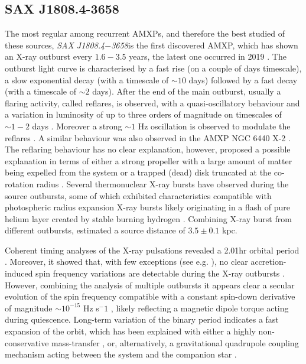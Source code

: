 \documentclass[graybox]{svmult}
\def \saxj{{\em SAX J1808.4$-$3658\xspace}}
\begin{document}
\subsection{SAX J1808.4-3658}

The most regular among recurrent AMXPs, and therefore the best studied of these sources, \saxj is the first discovered AMXP, which has shown an X-ray outburst every $1.6-3.5$ years, the latest one occurred in 2019 \cite{Bult2019c}. The outburst light curve is characterised by a fast rise (on a couple of days timescale), a slow exponential decay (with a timescale of $\sim 10$ days) followed by a fast decay (with a timescale of $\sim 2$ days). After the end of the main outburst, usually a flaring activity, called reflares, is observed, with a quasi-oscillatory behaviour and a variation in luminosity of up to three orders of magnitude on timescales of $\sim 1-2$ days \cite{Patruno2016}. Moreover a strong $\sim 1$ Hz oscillation is observed to modulate the reflares \cite{Bult2014}. A similar behaviour was also observed in the AMXP NGC 6440 X-2 \cite{Patruno2013}. The reflaring behaviour has no clear explanation, however, \cite{Patruno2016} proposed a possible explanation in terms of either a strong propeller with a large amount of matter being expelled from the system or a trapped (dead) disk truncated at the co-rotation radius \cite{DAngelo2012}.
Several thermonuclear X-ray bursts have observed during the source outbursts, some of which exhibited characteristics compatible with photospheric radius expansion X-ray bursts likely originating in a flash of pure helium layer created by stable burning hydrogen \cite{Galloway2006,Galloway2008}. Combining X-ray burst from different outbursts, \cite{Galloway2006} estimated a source distance of $3.5\pm0.1$ kpc.

Coherent timing analyses of the X-ray pulsations revealed a 2.01hr orbital period \cite{Chakrabarty1998}. Moreover, it showed that, with few exceptions (see e.g. \cite{Burderi2006}), no clear accretion-induced spin frequency variations are detectable during the X-ray outbursts \cite{Hartman2008,Patruno2012a,Patruno2017}. However, combining the analysis of multiple outbursts it appears clear a secular evolution of the spin frequency compatible with a constant spin-down derivative of magnitude $\sim10^{−15}$ Hz s$^−1$ \cite{Hartman2008,Patruno2012,Sanna2017c,Bult2019c}, likely reflecting a magnetic dipole torque acting during quiescence. Long-term variation of the binary period indicates a fast expansion of the orbit, which has been explained with either a highly non-conservative mass-transfer \cite{DiSalvo2008,Burderi2009, Sanna2017c}, or, alternatively, a gravitational quadrupole coupling mechanism acting between the system and the companion star \cite{Hartman2008,Patruno2012,Sanna2017c}.
\end{document}
